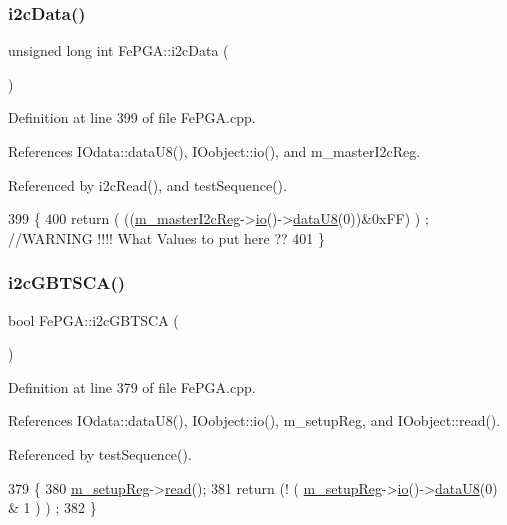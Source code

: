 \subsubsection{\texorpdfstring{i2c\+Data()}{i2cData()}}
{\footnotesize\ttfamily unsigned long int Fe\+P\+G\+A\+::i2c\+Data (\begin{DoxyParamCaption}{ }\end{DoxyParamCaption})}



Definition at line 399 of file Fe\+P\+G\+A.\+cpp.



References I\+Odata\+::data\+U8(), I\+Oobject\+::io(), and m\+\_\+master\+I2c\+Reg.



Referenced by i2c\+Read(), and test\+Sequence().


\begin{DoxyCode}
399                                 \{
400   \textcolor{keywordflow}{return} ( ((\hyperlink{classFePGA_adb390ea8de4a6cbce648dc62e4405f32}{m\_masterI2cReg}->\hyperlink{classIOobject_af04fb94137c3d86849f478ac5afab5d1}{io}()->\hyperlink{classIOdata_a75e9c318dbac3a39402179070943d4bc}{dataU8}(0))&0xFF) ) ; \textcolor{comment}{//WARNING !!!! What Values to
       put here ??}
401 \}
\end{DoxyCode}
\mbox{\label{classFePGA_a210cf57766c4f818ea61af671e91cfeb}} 
\subsubsection{\texorpdfstring{i2c\+G\+B\+T\+S\+C\+A()}{i2cGBTSCA()}}
{\footnotesize\ttfamily bool Fe\+P\+G\+A\+::i2c\+G\+B\+T\+S\+CA (\begin{DoxyParamCaption}{ }\end{DoxyParamCaption})}



Definition at line 379 of file Fe\+P\+G\+A.\+cpp.



References I\+Odata\+::data\+U8(), I\+Oobject\+::io(), m\+\_\+setup\+Reg, and I\+Oobject\+::read().



Referenced by test\+Sequence().


\begin{DoxyCode}
379                       \{
380   \hyperlink{classFePGA_a0255fe229013986b4387c3a75ddf4e97}{m\_setupReg}->\hyperlink{classIOobject_aa07610c11963b1db6710e3c76ceea456}{read}();
381   \textcolor{keywordflow}{return} (! ( \hyperlink{classFePGA_a0255fe229013986b4387c3a75ddf4e97}{m\_setupReg}->\hyperlink{classIOobject_af04fb94137c3d86849f478ac5afab5d1}{io}()->\hyperlink{classIOdata_a75e9c318dbac3a39402179070943d4bc}{dataU8}(0) & 1 ) ) ;
382 \}
\end{DoxyCode}
\mbox{\label{classFePGA_a939c5c23077210a2ad851a12694657a4}} 
